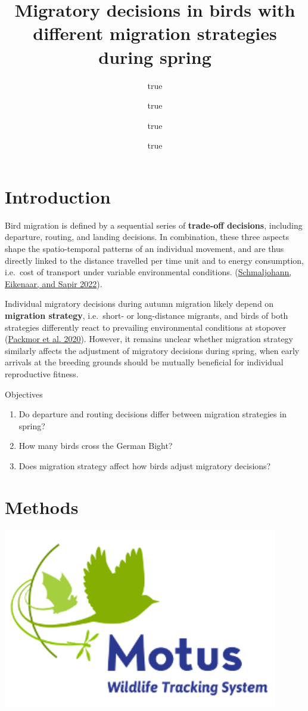 \documentclass[
]{article}
\title{\textbf{Migratory decisions in birds with different migration
strategies during spring}}
\author{true \and true \and true \and true}
\date{}
\providecommand{\tightlist}{%
  \setlength{\itemsep}{0pt}\setlength{\parskip}{0pt}}
\begin{document}
\maketitle

\hypertarget{introduction}{%
\section{Introduction}\label{introduction}}

Bird migration is defined by a sequential series of \textbf{trade-off
decisions}, including departure, routing, and landing decisions. In
combination, these three aspects shape the spatio-temporal patterns of
an individual movement, and are thus directly linked to the distance
travelled per time unit and to energy consumption, i.e.~cost of
transport under variable environmental conditions.
(\protect\hyperlink{ref-schmaljohann2022}{Schmaljohann, Eikenaar, and
Sapir 2022}).

Individual migratory decisions during autumn migration likely depend on
\textbf{migration strategy}, i.e.~short- or long-distance migrants, and
birds of both strategies differently react to prevailing environmental
conditions at stopover (\protect\hyperlink{ref-packmor2020}{Packmor et
al. 2020}). However, it remains unclear whether migration strategy
similarly affects the adjustment of migratory decisions during spring,
when early arrivals at the breeding grounds should be mutually
beneficial for individual reproductive fitness.

Objectives

\begin{enumerate}
\def\labelenumi{\arabic{enumi}.}
\tightlist
\item
  Do departure and routing decisions differ between migration strategies
  in spring?
\item
  How many birds cross the German Bight?
\item
  Does migration strategy affect how birds adjust migratory decisions?
\end{enumerate}

\hypertarget{methods}{%
\section{Methods}\label{methods}}

\href{https://motus.org/}{\includegraphics[width=0.9\textwidth,height=\textheight]{figures/motus.png}}
\end{document}
